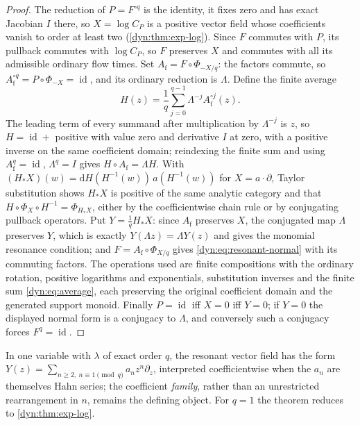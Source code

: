 \documentclass[11pt,letterpaper]{article}
\theoremstyle{definition}
\theoremstyle{remark}
\newcommand{\id}{\operatorname{id}}
\numberwithin{equation}{section}
\begin{document}
\begin{proof}
The reduction of $P=F^{\circ q}$ is the identity, it fixes zero and has
exact Jacobian $I$ there, so $X=\log C_P$ is a positive vector field whose
coefficients vanish to order at least two (\cref{dyn:thm:exp-log}). Since
$F$ commutes with $P$, its pullback commutes with $\log C_P$, so $F$
preserves $X$ and commutes with all its admissible ordinary flow times.
Set $A_{\mathrm f}=F\circ\Phi_{-X/q}$: the factors commute, so
$A_{\mathrm f}^{\circ q}=P\circ\Phi_{-X}=\id$, and its ordinary reduction
is $\Lambda$. Define the finite average
\begin{equation}\label{dyn:eq:average}
 H(z)=\frac1q\sum_{j=0}^{q-1}\Lambda^{-j}A_{\mathrm f}^{\circ j}(z).
\end{equation}
The leading term of every summand after multiplication by $\Lambda^{-j}$ is
$z$, so $H=\id+$ positive with value zero and derivative $I$ at zero, with
a positive inverse on the same coefficient domain; reindexing the finite sum
and using $A_{\mathrm f}^{q}=\id$, $\Lambda^{q}=I$ gives
$H\circ A_{\mathrm f}=\Lambda H$. With
$(H_{*}X)(w)=\mathrm dH(H^{-1}(w))\,a(H^{-1}(w))$ for $X=a\cdot\partial$,
Taylor substitution shows $H_{*}X$ is positive of the same analytic
category and that $H\circ\Phi_X\circ H^{-1}=\Phi_{H_{*}X}$, either by the
coefficientwise chain rule or by conjugating pullback operators. Put
$Y=\frac1qH_{*}X$: since $A_{\mathrm f}$ preserves $X$, the conjugated map
$\Lambda$ preserves $Y$, which is exactly $Y(\Lambda z)=\Lambda Y(z)$ and
gives the monomial resonance condition; and $F=A_{\mathrm f}\circ\Phi_{X/q}$
gives \eqref{dyn:eq:resonant-normal} with its commuting factors. The
operations used are finite compositions with the ordinary rotation,
positive logarithms and exponentials, substitution inverses and the finite
sum \eqref{dyn:eq:average}, each preserving the original coefficient domain
and the generated support monoid. Finally $P=\id$ iff $X=0$ iff $Y=0$; if
$Y=0$ the displayed normal form is a conjugacy to $\Lambda$, and
conversely such a conjugacy forces $F^{q}=\id$.
\end{proof}

In one variable with $\lambda$ of exact order $q$, the resonant vector field
has the form $Y(z)=\sum_{n\ge2,\ n\equiv1\!\pmod q}a_nz^{n}\partial_z$,
interpreted coefficientwise when the $a_n$ are themselves Hahn series; the
coefficient \emph{family}, rather than an unrestricted rearrangement in
$n$, remains the defining object. For $q=1$ the theorem reduces to
\cref{dyn:thm:exp-log}.
\end{document}
